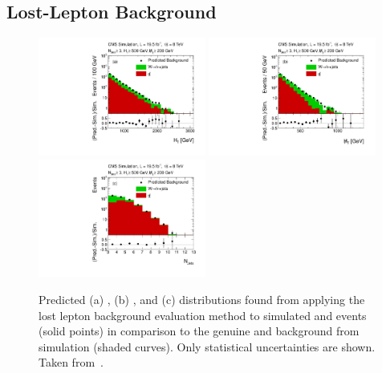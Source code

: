 \subsection{Lost-Lepton Background}
\label{subsec:RA2_lostlepton}
\begin{figure}[!t]
  \centering

  \begin{minipage}[c]{1.\textwidth}
    \begin{center}
      \includegraphics[width=0.49\textwidth]{figures/RA2_LL1.pdf}%
      \includegraphics[width=0.49\textwidth]{figures/RA2_LL2.pdf}\\ 
      \includegraphics[width=0.49\textwidth]{figures/RA2_LL3.pdf}
    \end{center}
  \end{minipage}

  \caption{Predicted (a) \HT, (b) \MHT, and (c) \NJets distributions found from applying the lost lepton background evaluation method to simulated \ttbar and \WJets events (solid points) in comparison to the genuine \ttbar and \WJets background from simulation (shaded curves). Only statistical uncertainties are shown. Taken from~\cite{Chatrchyan:2014lfa}.}
  \label{fig:ra2_ll}
\end{figure}
